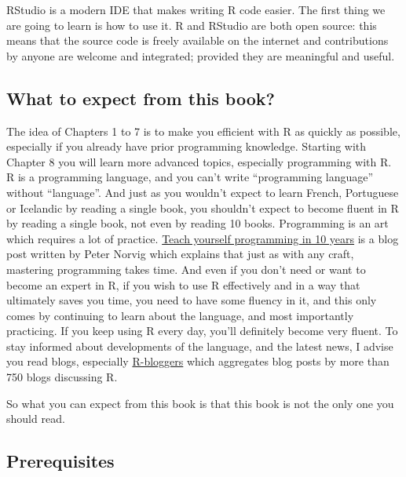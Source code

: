 \documentclass[
]{article}
\begin{document}
RStudio is a modern IDE that makes writing R code easier. The first thing we are going to learn is
how to use it.
R and RStudio are both open source: this means that the source code is freely available on
the internet and contributions by anyone are welcome and integrated; provided they are meaningful
and useful.

\hypertarget{what-to-expect-from-this-book}{%
\subsection*{What to expect from this book?}\label{what-to-expect-from-this-book}}

The idea of Chapters 1 to 7 is to make you efficient with R as quickly as possible, especially if
you already have prior programming knowledge. Starting with Chapter 8 you will learn more advanced
topics, especially programming with R. R is a programming language, and you can't write
``programming language'' without ``language''. And just as you wouldn't expect to learn
French, Portuguese or Icelandic by reading a single book, you shouldn't expect to become fluent in R
by reading a single book, not even by reading 10 books. Programming is an art which requires a lot of
practice. \href{http://www.norvig.com/21-days.html}{Teach yourself programming in 10 years} is a blog
post written by Peter Norvig which explains that just as with any craft, mastering programming
takes time. And even if you don't need or want to become an expert in R, if you wish to use R
effectively and in a way that ultimately saves you time, you need to have some fluency in it, and
this only comes by continuing to learn about the language, and most importantly practicing. If you
keep using R every day, you'll definitely become very fluent. To stay informed about developments of
the language, and the latest news, I advise you read blogs, especially
\href{https://www.r-bloggers.com/}{R-bloggers} which aggregates blog posts by more than 750 blogs
discussing R.

So what you can expect from this book is that this book is not the only one you should read.

\hypertarget{prerequisites}{%
\subsection*{Prerequisites}\label{prerequisites}}
\end{document}
